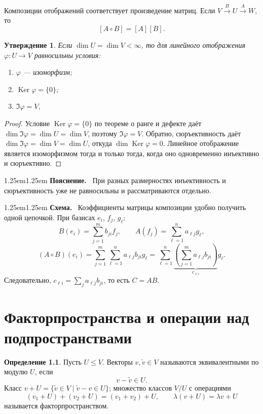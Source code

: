 \documentclass[12pt,a4paper,oneside,openany]{book}
\theoremstyle{definition}
\newtheorem{definition}{Определение}[chapter]
\theoremstyle{plain}
\newtheorem{proposition}{Утверждение}[chapter]
\theoremstyle{remark}
\newenvironment{explanation}
  {\begin{adjustwidth}{1.25em}{1.25em}\small
   \noindent\textcolor{logicteal}{\sffamily\bfseries Пояснение.}\ }
  {\par\end{adjustwidth}}
\newenvironment{visualreconstruction}
  {\begin{adjustwidth}{1.25em}{1.25em}\small
   \noindent\textcolor{logicgray}{\sffamily\bfseries Схема.}\ }
  {\par\end{adjustwidth}}
\DeclareMathOperator{\Ker}{Ker}
\begin{document}
Композиции отображений соответствует произведение матриц. Если
$V\xrightarrow{B}U\xrightarrow{A}W$, то
\[
  [A\circ B]=[A][B].
\]

\begin{proposition}
Если $\dim U=\dim V<\infty$, то для линейного отображения
$\varphi\colon U\to V$ равносильны условия:
\begin{enumerate}[label=\arabic*)]
  \item $\varphi$ --- изоморфизм;
  \item $\Ker\varphi=\{0\}$;
  \item $\Im\varphi=V$,
\end{enumerate}
\end{proposition}

\begin{proof}
Условие $\Ker\varphi=\{0\}$ по теореме о ранге и дефекте даёт
$\dim\Im\varphi=\dim U=\dim V$, поэтому $\Im\varphi=V$. Обратно,
сюръективность даёт $\dim\Im\varphi=\dim V=\dim U$, откуда
$\dim\Ker\varphi=0$. Линейное отображение является изоморфизмом тогда и
только тогда, когда оно одновременно инъективно и сюръективно.
\end{proof}

\begin{explanation}
При разных размерностях инъективность и сюръективность уже не
равносильны и рассматриваются отдельно.
\end{explanation}

\begin{visualreconstruction}
Коэффициенты матрицы композиции удобно получить одной цепочкой. При
базисах $e_i$, $f_j$, $g_\ell$:
\[
  B(e_i)=\sum_{j=1}^{m}b_{ji}f_j,
  \qquad
  A(f_j)=\sum_{\ell=1}^{n}a_{\ell j}g_\ell,
\]
\[
  (A\circ B)(e_i)
  =\sum_{j=1}^{m}\sum_{\ell=1}^{n}a_{\ell j}b_{ji}g_\ell
  =\sum_{\ell=1}^{n}
    \underbrace{\left(\sum_{j=1}^{m}a_{\ell j}b_{ji}\right)}_{c_{\ell i}}
    g_\ell .
\]
Следовательно, $c_{\ell i}=\sum_j a_{\ell j}b_{ji}$, то есть
$C=AB$.
\end{visualreconstruction}


\chapter[Факторпространства и операции над подпространствами]
{Факторпространства и операции над\\ подпространствами}

\begin{definition}
Пусть $U\leq V$. Векторы $v,\tilde v\in V$ называются эквивалентными
по модулю $U$, если
\[
  v-\tilde v\in U.
\]
Класс $v+U=\{\tilde v\in V\mid \tilde v-v\in U\}$; множество классов
$V/U$ с операциями
\[
  (v_1+U)+(v_2+U)=(v_1+v_2)+U,
  \qquad
  \lambda(v+U)=\lambda v+U
\]
называется факторпространством.
\end{definition}
\end{document}
